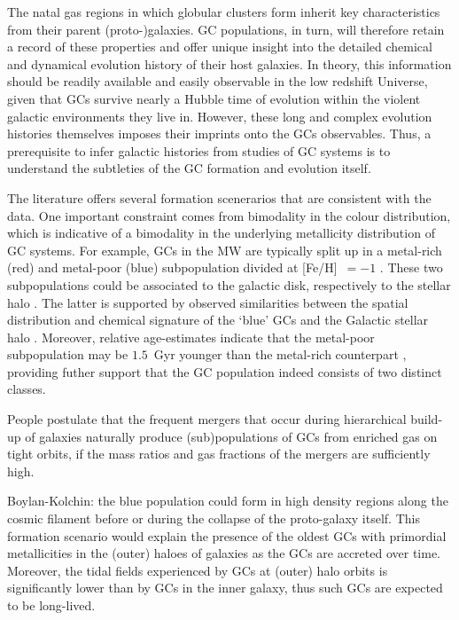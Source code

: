 \documentclass[a4paper,fleqn,usenatbib]{mnras}
\begin{document}
The natal gas regions in which globular clusters form inherit key characteristics 
from their parent (proto-)galaxies. GC populations, in turn, will therefore retain 
a record of these properties and offer unique insight into the detailed chemical 
and dynamical evolution history of their host galaxies. In theory, this information 
should be readily available and easily observable in the low redshift Universe, given 
that GCs survive nearly a Hubble time of evolution within the violent galactic 
environments they live in. However, these long and complex evolution histories
themselves imposes their imprints onto the GCs observables. Thus, a prerequisite to 
infer galactic histories from studies of GC systems is to understand the 
subtleties of the GC formation and evolution itself.

The literature offers several formation scenerarios that are consistent with the 
data. One important constraint comes from bimodality in the colour distribution, 
which is indicative of a bimodality in the underlying metallicity distribution 
of GC systems. For example, GCs in the MW are typically split up in a metal-rich 
(red) and metal-poor (blue) subpopulation divided at [Fe/H]~$=-1$ 
\citep[e.g.][]{Harris2001}. These two subpopulations could be associated to the 
galactic disk, respectively to the stellar halo \citep[e.g.][]{1985ApJ...293..424Z}. 
The latter is supported by observed similarities between the spatial distribution
and chemical signature of the `blue' GCs and the Galactic stellar halo 
\citep{2008A&ARv..15..145H}. Moreover, relative age-estimates indicate that the 
metal-poor subpopulation may be $1.5$~Gyr younger than the metal-rich counterpart 
\citep{2005AJ....130..116D}, providing futher support that the GC population indeed
consists of two distinct classes.

People postulate that the frequent mergers that occur during hierarchical build-up 
of galaxies naturally produce (sub)populations of GCs from enriched gas on tight 
orbits, if the mass ratios and gas fractions of the mergers are sufficiently high.

Boylan-Kolchin: the blue population could form in high density regions along the 
cosmic filament before or during the collapse of the proto-galaxy itself.
This formation scenario would explain the presence of the oldest GCs with 
primordial metallicities in the (outer) haloes of galaxies as the GCs are
accreted over time. Moreover, the tidal fields experienced by GCs at (outer) halo
orbits is significantly lower than by GCs in the inner galaxy, thus such GCs
are expected to be long-lived.
\end{document}
